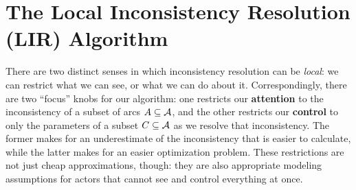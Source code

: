 \documentclass{article} %
\theoremstyle{plain}
\theoremstyle{definition}
\theoremstyle{remark}
\let\cite\citep
\newcommand\vfull[1]{}
\begin{document}
\vfull{
PDG inference is fixed-parameter tractable:
assuming a graph with bounded tree-width, the  can be computed in polynomial time.
and it appears that \cite{pdg-infer}.
Several important algorithms can alredy be seen as inconsistency reduction.
When viewed as a graphical model}





\section{The Local Inconsistency Resolution (LIR) Algorithm}
There are two distinct senses in which inconsistency resolution can
   be \emph{local}: we can restrict what we can see, or what we can do about it.
Correspondingly, there are two ``focus'' knobs for our algorithm:
   one restricts our \textbf{attention} to the inconsistency of a subset of arcs $A \subseteq \mathcal A$,
   and the other restricts our \textbf{control} to only the parameters of a subset
   $C
    \subseteq \mathcal A$
     as we resolve that inconsistency.
The former makes for an underestimate of the inconsistency that is easier to calculate, while
the latter
makes for an easier optimization problem.
These restrictions are not just cheap approximations, though:
   they are also appropriate modeling assumptions for
   actors that cannot see and control everything at once.
\end{document}
